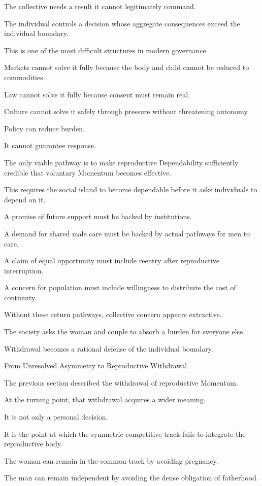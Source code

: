 The collective needs a result it cannot legitimately command.

The individual controls a decision whose aggregate consequences exceed the individual boundary.

This is one of the most difficult structures in modern governance.

Markets cannot solve it fully because the body and child cannot be reduced to commodities.

Law cannot solve it fully because consent must remain real.

Culture cannot solve it safely through pressure without threatening autonomy.

Policy can reduce burden.

It cannot guarantee response.

The only viable pathway is to make reproductive Dependability sufficiently credible that voluntary Momentum becomes effective.

This requires the social island to become dependable before it asks individuals to depend on it.

A promise of future support must be backed by institutions.

A demand for shared male care must be backed by actual pathways for men to care.

A claim of equal opportunity must include reentry after reproductive interruption.

A concern for population must include willingness to distribute the cost of continuity.

Without these return pathways, collective concern appears extractive.

The society asks the woman and couple to absorb a burden for everyone else.

Withdrawal becomes a rational defense of the individual boundary.

From Unresolved Asymmetry to Reproductive Withdrawal

The previous section described the withdrawal of reproductive Momentum.

At the turning point, that withdrawal acquires a wider meaning.

It is not only a personal decision.

It is the point at which the symmetric competitive track fails to integrate the reproductive body.

The woman can remain in the common track by avoiding pregnancy.

The man can remain independent by avoiding the dense obligation of fatherhood.

